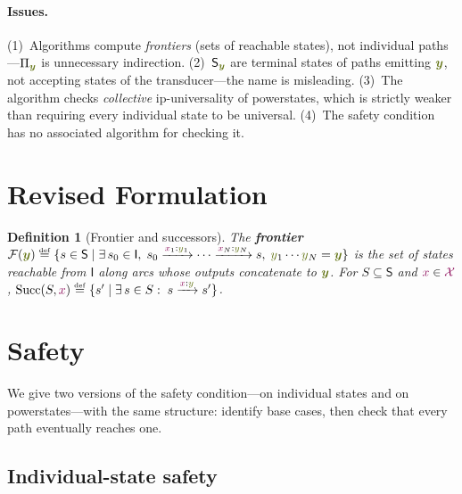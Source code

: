 \documentclass{article}
\newcommand{\mymacro}[1]{#1}
\newcommand{\defn}[1]{\textbf{#1}}
\newcommand{\defeq}{\mathrel{\overset{\raisebox{-0.25ex}{\textnormal{\tiny def}}}{=}}}
\newcommand{\srcSym}{{\color{TokenColor}x}}
\newcommand{\tgtSym}{{\color{CharacterColor}y}}
\newcommand{\tgtStr}{{\color{CharacterColor}\boldsymbol{y}}}
\newcommand{\srcAlphabet}[0]{{\color{TokenColor}\ensuremath{\mathcal{X}}}\xspace}
\newcommand{\States}{\mymacro{\mathsf{S}}}
\newcommand{\InitialStates}[0]{\mymacro{\mathsf{I}}}
\newcommand{\state}{\mymacro{s}}
\newcommand{\statep}{\mymacro{s^\prime}}
\newcommand{\frontier}{\mathcal{F}}
\newcommand{\powerstate}{S}
\newcommand{\Paths}{\mymacro{\Pi}}
\newcommand{\Succ}{\mathrm{Succ}}
\theoremstyle{plain}
\newtheorem{definition}[theorem]{Definition}
\begin{document}
\paragraph{Issues.}
(1)~Algorithms compute \emph{frontiers} (sets of reachable states), not
individual paths---$\Paths_{\tgtStr}$ is unnecessary indirection.
(2)~$\States_{\tgtStr}$ are terminal states of paths emitting $\tgtStr$, not
accepting states of the transducer---the name is misleading.
(3)~The algorithm checks \emph{collective} ip-universality of powerstates,
which is strictly weaker than requiring every individual state to be universal.
(4)~The safety condition has no associated algorithm for checking it.


\section{Revised Formulation}
\label{sec:revised}

\begin{definition}[Frontier and successors]
\label{def:frontier}
The \defn{frontier} $\frontier(\tgtStr) \defeq \{ \state \in \States \mid
\exists\, \state_0 \in \InitialStates,\;
\state_0 \xrightarrow{\srcSym_1:\tgtSym_1} \cdots \xrightarrow{\srcSym_N:\tgtSym_N} \state,\;
\tgtSym_1 \cdots \tgtSym_N = \tgtStr \}$
is the set of states reachable from $\InitialStates$ along arcs whose outputs
concatenate to $\tgtStr$.  For $\powerstate \subseteq \States$ and $\srcSym \in \srcAlphabet$,
$\Succ(\powerstate, \srcSym) \defeq
\{ \statep \mid \exists\, \state \in \powerstate :\;
\state \xrightarrow{\srcSym:\tgtSym} \statep \}$.
\end{definition}


\section{Safety}
\label{sec:safety}

We give two versions of the safety condition---on individual states and on
powerstates---with the same structure: identify base cases, then check that
every path eventually reaches one.

\subsection{Individual-state safety}
\label{sec:level1}
\end{document}
